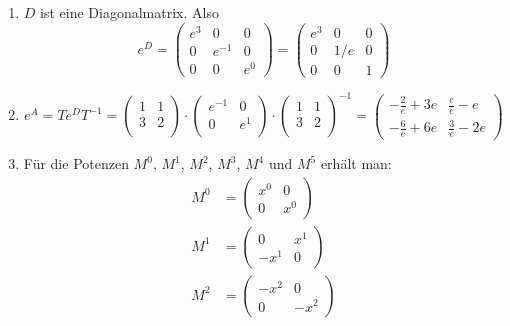 \begin{enumerate}
	      Daher ist die Lösung $e^N = \begin{pmatrix} 1 & 0 \\ 4 & 1 \end{pmatrix}$.
	\item $D$ ist eine Diagonalmatrix. Also
	      $$
		      e^D = \begin{pmatrix} e^3 & 0 & 0 \\ 0 & e^{-1} & 0 \\ 0& 0 & e^0 \end{pmatrix} = \begin{pmatrix} e^3 & 0 & 0 \\ 0 & 1/e & 0 \\ 0& 0 & 1 \end{pmatrix}
	      $$
	\item $$ e^A = T e^D T^{-1} = \begin{pmatrix}
			      1 & 1 \\
			      3 & 2 \\
		      \end{pmatrix} \cdot
		      \begin{pmatrix}
			      e^{-1} & 0     \\
			      0      & e^{1} \\
		      \end{pmatrix}\cdot
		      \begin{pmatrix}
			      1 & 1 \\
			      3 & 2 \\
		      \end{pmatrix}^{-1} = \begin{pmatrix}
			      -\frac{2}{e}+3e & \frac{e}{e}-e  \\
			      -\frac{6}{e}+6e & \frac{3}{e}-2e
		      \end{pmatrix}
	      $$
	\item Für die Potenzen $M^0$, $M^1$, $M^{2}$, $M^{3}$, $M^{4}$ und $M^{5}$ erhält man:
	      \begin{align*}
		      M^0 & =  \begin{pmatrix} x^{0} &  0\\ 0 & x^{0} \end{pmatrix}  \\
		      M^1 & = \begin{pmatrix} 0 & x^{1} \\ -x^{1} & 0 \end{pmatrix}  \\
		      M^2 & = \begin{pmatrix}  -x^{2} & 0 \\ 0& -x^{2} \end{pmatrix} \\

\end{align*}
\end{enumerate}
